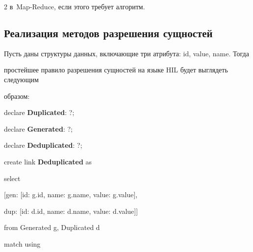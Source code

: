 \begin{multicols}{2}
  в~Map-Reduce, если этого требует алгоритм.



  \vspace*{-6pt}



  \subsection{Реализация методов разрешения сущностей}



  \vspace*{-2pt}



  Пусть даны структуры данных, включающие три атрибута: id, value, name. Тогда

простейшее правило разрешения сущностей на языке HIL будет выглядеть следующим

образом:



{\sf \noindent

  declare \textbf{Duplicated}: ?;



\noindent

  declare \textbf{Generated}: ?;



\noindent

  declare \textbf{Deduplicated}: ?;



  \vspace*{6pt}



\noindent

  create link \textbf{Deduplicated} as



\noindent

  select



\noindent

  [gen: [id: g.id, name: g.name, value: g.value],



\noindent

  dup: [id: d.id, name: d.name, value: d.value]]



\noindent

  from Generated g, Duplicated d



\noindent

  match using



}
\end{multicols}
